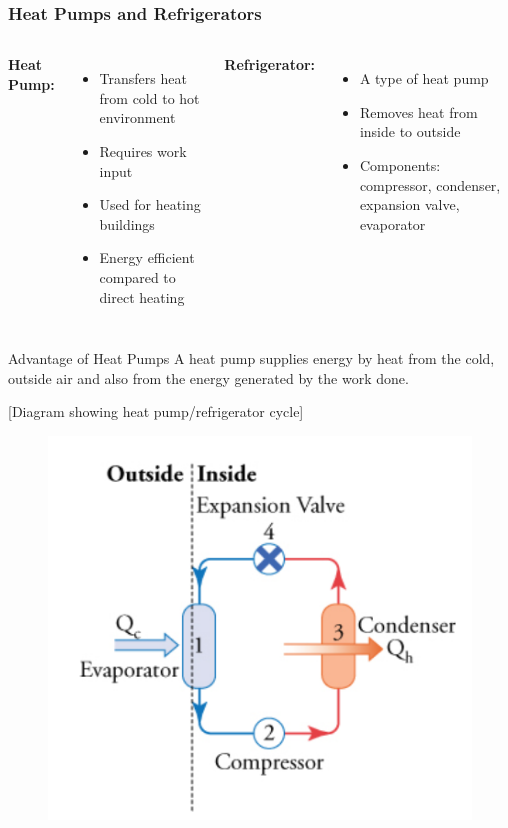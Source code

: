 \documentclass{beamer}
\begin{document}
\begin{frame}
    \frametitle{Heat Pumps and Refrigerators}
    \begin{columns}
        \textbf{Heat Pump:}
        \begin{itemize}
            \item Transfers heat from cold to hot environment
            \item Requires work input
            \item Used for heating buildings
            \item Energy efficient compared to direct heating
        \end{itemize}
        
        \textbf{Refrigerator:}
        \begin{itemize}
            \item A type of heat pump
            \item Removes heat from inside to outside
            \item Components: compressor, condenser, expansion valve, evaporator
        \end{itemize}
    \end{columns}
    
    \begin{block}{Advantage of Heat Pumps}
        A heat pump supplies energy by heat from the cold, outside air and also from the energy generated by the work done.
    \end{block}
    
    \begin{center}
        \alert{[Diagram showing heat pump/refrigerator cycle]}
    \end{center}
\end{frame}


\begin{frame}
\begin{figure}
    \centering
    \includegraphics[width=0.75\linewidth]{ifsdmage.png}
\end{figure}
\end{frame}
\end{document}
